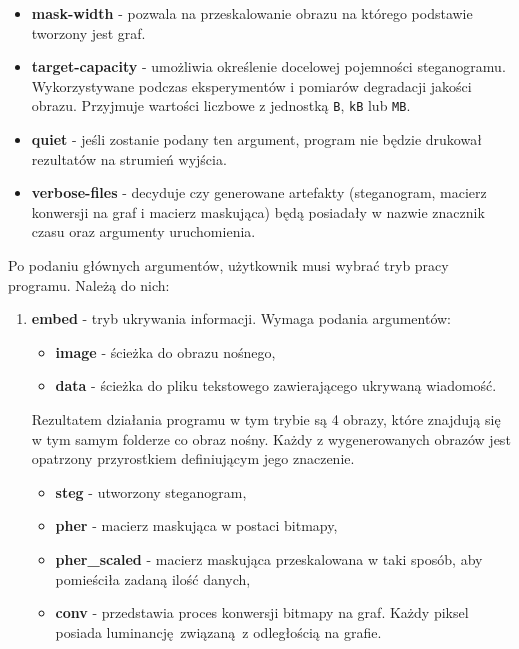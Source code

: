 {{{\begin{itemize}
                się zatrzymać.
                \item \textbf{mask-width} - pozwala na przeskalowanie obrazu na którego podstawie tworzony jest graf.
                \item \textbf{target-capacity} - umożliwia określenie docelowej pojemności steganogramu. Wykorzystywane
                podczas eksperymentów i pomiarów degradacji jakości obrazu. Przyjmuje wartości liczbowe z jednostką
                \lstinline{B}, \lstinline{kB} lub \lstinline{MB}.
                \item \textbf{quiet} - jeśli zostanie podany ten argument, program nie będzie drukował rezultatów na
                strumień wyjścia.
                \item \textbf{verbose-files} - decyduje czy generowane artefakty (steganogram, macierz konwersji na
                graf i macierz maskująca) będą posiadały w nazwie znacznik czasu oraz argumenty uruchomienia.
            \end{itemize}


            Po podaniu głównych argumentów, użytkownik musi wybrać tryb pracy programu. Należą do nich:

            \begin{enumerate}
                \item \textbf{embed} - tryb ukrywania informacji. Wymaga podania argumentów:
                    \begin{itemize}
                        \item \textbf{image} - ścieżka do obrazu nośnego,
                        \item \textbf{data} - ścieżka do pliku tekstowego zawierającego ukrywaną wiadomość.
                    \end{itemize}

                    Rezultatem działania programu w tym trybie są 4 obrazy, które znajdują się w tym samym folderze co
                    obraz nośny. Każdy z wygenerowanych obrazów jest opatrzony przyrostkiem definiującym jego znaczenie.

                    \begin{itemize}
                        \item \textbf{steg} - utworzony steganogram,
                        \item \textbf{pher} - macierz maskująca w postaci bitmapy,
                        \item \textbf{pher\_scaled} - macierz maskująca przeskalowana w taki sposób, aby pomieściła
                        zadaną ilość danych,
                        \item \textbf{conv} - przedstawia proces konwersji bitmapy na graf. Każdy piksel posiada
                        luminancję związaną z odległością na grafie.
                    \end{itemize}


\end{enumerate}}}}
